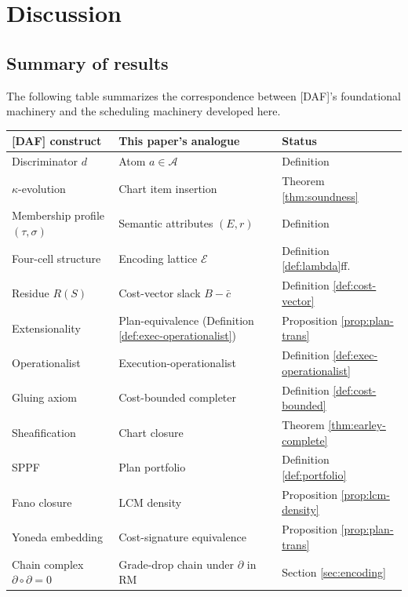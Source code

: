 \section{Discussion}\label{sec:discussion}

\subsection{Summary of results}

The following table summarizes the correspondence
between [DAF]'s foundational machinery and the
scheduling machinery developed here.

\medskip
\begin{center}
\begin{tabular}{l|l|l}
\textbf{[DAF] construct} & \textbf{This paper's analogue} & \textbf{Status} \\
\hline
Discriminator $d$ & Atom $a \in \mathcal{A}$ & Definition \\
$\kappa$-evolution & Chart item insertion & Theorem \ref{thm:soundness} \\
Membership profile $(\tau, \sigma)$ & Semantic attributes $(E, r)$ & Definition \\
Four-cell structure & Encoding lattice $\mathcal{E}$ & Definition \ref{def:lambda}ff. \\
Residue $R(S)$ & Cost-vector slack $B - \bar{c}$ & Definition \ref{def:cost-vector} \\
Extensionality & Plan-equivalence (Definition \ref{def:exec-operationalist}) & Proposition \ref{prop:plan-trans} \\
Operationalist & Execution-operationalist & Definition \ref{def:exec-operationalist} \\
Gluing axiom & Cost-bounded completer & Definition \ref{def:cost-bounded} \\
Sheafification & Chart closure & Theorem \ref{thm:earley-complete} \\
SPPF & Plan portfolio & Definition \ref{def:portfolio} \\
Fano closure & LCM density & Proposition \ref{prop:lcm-density} \\
Yoneda embedding & Cost-signature equivalence & Proposition \ref{prop:plan-trans} \\
Chain complex $\partial \circ \partial = 0$ & Grade-drop chain under $\partial$ in RM & Section \ref{sec:encoding} \\
\end{tabular}
\end{center}

